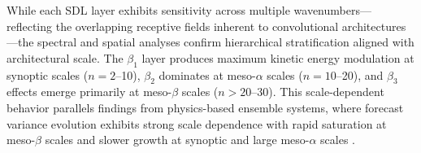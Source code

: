 \documentclass[11pt]{article}
\begin{document}
While each SDL layer exhibits sensitivity across multiple wavenumbers—reflecting the overlapping receptive fields inherent to convolutional architectures—the spectral and spatial analyses confirm hierarchical stratification aligned with architectural scale. The $\beta_1$ layer produces maximum kinetic energy modulation at synoptic scales ($n=2$--10), $\beta_2$ dominates at meso-$\alpha$ scales ($n=10$--20), and $\beta_3$ effects emerge primarily at meso-$\beta$ scales ($n>20$--30). This scale-dependent behavior parallels findings from physics-based ensemble systems, where forecast variance evolution exhibits strong scale dependence with rapid saturation at meso-$\beta$ scales and slower growth at synoptic and large meso-$\alpha$ scales \cite{rodwell2025}.


\end{document}
